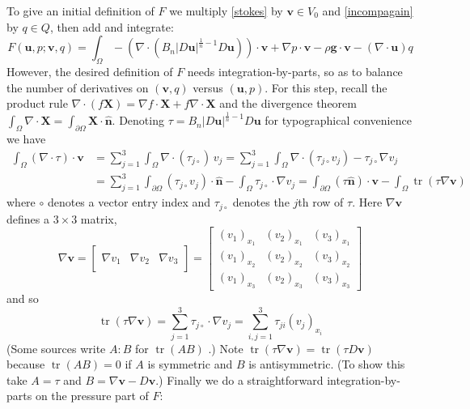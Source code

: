\documentclass[letterpaper,final,12pt,reqno]{amsart}
\newcommand{\grad}{\nabla}
\newcommand{\trace}{\operatorname{tr}}
\newcommand{\hbn}{\hat{\mathbf{n}}}
\newcommand{\bu}{\mathbf{u}}
\newcommand{\bv}{\mathbf{v}}
\newcommand{\bX}{\mathbf{X}}
\begin{document}
To give an initial definition of $F$ we multiply \eqref{stokes} by $\bv\in V_0$ and \eqref{incompagain} by $q\in Q$, then add and integrate:
\begin{equation}
F(\bu,p;\bv,q) = \int_\Omega - \left(\nabla \cdot \left(B_n |D\bu|^{\frac{1}{n} - 1} D\bu\right)\right)\cdot \bv + \nabla p \cdot \bv - \rho \mathbf{g} \cdot \bv - \left(\nabla \cdot \bu\right) q \label{nonfuncone}
\end{equation}
However, the desired definition of $F$ needs integration-by-parts, so as to balance the number of derivatives on $(\bv,q)$ versus $(\bu,p)$.  For this step, recall the product rule $\nabla \cdot(f\bX) = \grad f\cdot \bX + f \nabla \cdot \bX$ and the divergence theorem $\int_\Omega \nabla \cdot \bX = \int_{\partial \Omega} \bX \cdot \hbn$.  Denoting $\tau = B_n |D\bu|^{\frac{1}{n} - 1} D\bu$ for typographical convenience we have
\begin{align*}
\int_\Omega \left(\nabla \cdot \tau\right)\cdot \bv &= \sum_{j=1}^3 \int_\Omega \nabla \cdot (\tau_{j\circ})\, v_j = \sum_{j=1}^3 \int_\Omega \nabla \cdot (\tau_{j\circ} v_j) - \tau_{j\circ} \nabla v_j \\
  &= \sum_{j=1}^3 \int_{\partial \Omega} (\tau_{j\circ} v_j) \cdot \hbn - \int_\Omega \tau_{j\circ} \cdot \nabla v_j = \int_{\partial \Omega} (\tau \hbn)\cdot \bv - \int_\Omega \trace(\tau \nabla \bv)
\end{align*}
where $\circ$ denotes a vector entry index and $\tau_{j\circ}$ denotes the $j$th row of $\tau$.  Here $\grad\bv$ defines a $3\times 3$ matrix,
\newcommand{\trefthree}[3]{\left[\begin{array}{c|c|c} & & \\ #1 & #2 & #3 \\ & & \end{array}\right]}
    $$\grad \bv = \trefthree{\grad v_1}{\grad v_2}{\grad v_3} = \begin{bmatrix}
    (v_1)_{x_1} & (v_2)_{x_1} & (v_3)_{x_1} \\
    (v_1)_{x_2} & (v_2)_{x_2} & (v_3)_{x_2} \\
    (v_1)_{x_3} & (v_2)_{x_3} & (v_3)_{x_3}
    \end{bmatrix}$$
and so
    $$\trace(\tau \grad \bv) = \sum_{j=1}^3 \tau_{j\circ} \cdot \grad v_j = \sum_{i,j=1}^3 \tau_{ji} (v_j)_{x_i}$$
(Some sources write $A:B$ for $\trace(AB)$ \cite{JouvetRappaz2011}.)  Note $\trace(\tau \grad \bv) = \trace(\tau D\bv)$ because $\trace(AB)=0$ if $A$ is symmetric and $B$ is antisymmetric.  (To show this take $A=\tau$ and $B=\grad\bv-D\bv$.)  Finally we do a straightforward integration-by-parts on the pressure part of $F$:
\end{document}
